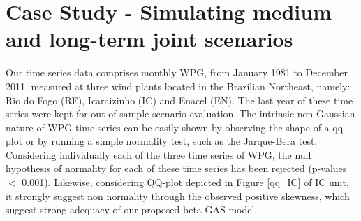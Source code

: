 \documentclass[a4paper]{IEEEtran}
\begin{document}

 





\section{Case Study - Simulating medium and long-term joint scenarios} \label{Application}

Our time series data comprises monthly WPG, from January 1981 to December 2011, measured at three wind plants located in the Brazilian Northeast, namely: Rio do Fogo (RF), Icaraizinho (IC) and Enacel (EN). The last year of these time series were kept for out of sample scenario evaluation. The intrinsic non-Gaussian nature of WPG time series can be easily shown by observing the shape of a qq-plot or by running a simple normality test, such as the Jarque-Bera test. Considering individually each of the three time series of WPG, the null hypothesis of normality for each of these time series has been rejected (p-values $<$ 0.001). Likewise, considering QQ-plot depicted in Figure \ref{qq_IC} of IC unit, it strongly suggest non normality through the observed positive skewness, which suggest strong adequacy of our proposed beta GAS model.
\end{document}
